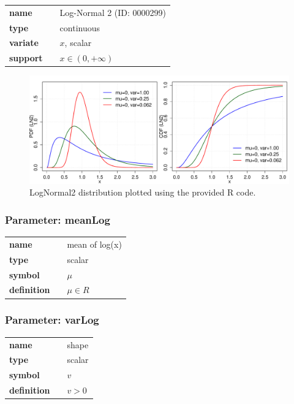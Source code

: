   \bigskip 

\begin{tabular}{p{2cm}cl}
\textbf{name} & & Log-Normal 2 (ID: 0000299)\\ 
 
\textbf{type} & & continuous \\ 

\textbf{variate} & & $x$, scalar \\ 

\textbf{support} & & $x \in (0,+\infty)$
\end{tabular}

\begin{figure}[ht!]
\centering
  \includegraphics[width=140mm]{pics/LogNormal2.pdf}
 \caption{LogNormal2 distribution plotted using the provided R code.}
 \label{fig:LogNormal2}
\end{figure}

\subsubsection*{Parameter: meanLog}

\noindent\begin{tabular}{p{2cm}cl}
\textbf{name} & & mean of log(x) \\
\textbf{type} & & scalar \\
\textbf{symbol} & & $\mu$  \\
\textbf{definition} & & $\mu \in R$
\end{tabular}
\subsubsection*{Parameter: varLog}

\noindent\begin{tabular}{p{2cm}cl}
\textbf{name} & & shape \\
\textbf{type} & & scalar \\
\textbf{symbol} & & $v$  \\
\textbf{definition} & & $v > 0$
\end{tabular}
